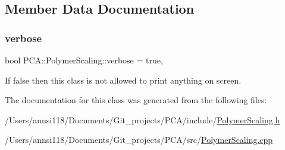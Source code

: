 \subsection{Member Data Documentation}
\hypertarget{class_p_c_a_1_1_polymer_scaling_ade3a687fb33d7c74e78b38d3aca3a1ab}{}\label{class_p_c_a_1_1_polymer_scaling_ade3a687fb33d7c74e78b38d3aca3a1ab} 
\subsubsection{\texorpdfstring{verbose}{verbose}}
{\footnotesize\ttfamily bool P\+C\+A\+::\+Polymer\+Scaling\+::verbose = true\hspace{0.3cm}{\ttfamily [static]}, {\ttfamily [private]}}



If false then this class is not allowed to print anything on screen. 



The documentation for this class was generated from the following files\+:\begin{DoxyCompactItemize}
\item 
/\+Users/annsi118/\+Documents/\+Git\+\_\+projects/\+P\+C\+A/include/\hyperlink{_polymer_scaling_8h}{Polymer\+Scaling.\+h}\item 
/\+Users/annsi118/\+Documents/\+Git\+\_\+projects/\+P\+C\+A/src/\hyperlink{_polymer_scaling_8cpp}{Polymer\+Scaling.\+cpp}\end{DoxyCompactItemize}
